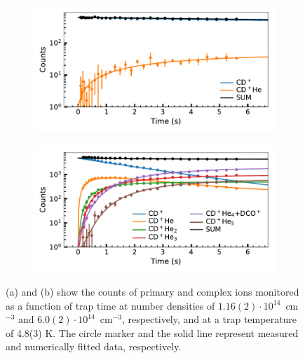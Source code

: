 \begin{figure}[!htb]

    \centering

    \begin{subfigure}[b]{0.49\textwidth}
        \centering
        \includegraphics[width=1\textwidth]{figures/measurements/kinetics/off_kinetics_1.16_2e+14.pdf}
        \caption{}
        
    \end{subfigure}
    \hfill
    \begin{subfigure}[b]{0.49\textwidth}
        \centering
        \includegraphics[width=1\textwidth]{figures/measurements/kinetics/off_kinetics_6.04_25e+14.pdf}
        \caption{}
        
    \end{subfigure}
    
    \caption{(a) and (b) show the counts of primary and complex ions monitored as a function of trap time at number densities of $ 1.16(2)\cdot10^{14}$~cm$^{-3}$ and  $6.0(2)\cdot10^{14}$~cm$^{-3}$, respectively, and at a trap temperature of 4.8(3) K. The circle marker and the solid line represent measured and numerically fitted data, respectively.}
    \label{fig:fit:rate-constants}

\end{figure}